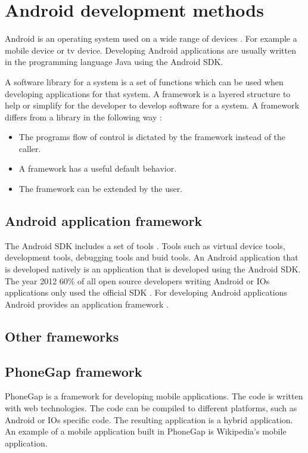 \section{Android development methods}\label{section-android-development-methods}
Android is an operating system used on a wide range of devices \cite{dell2011}. For example a mobile device or tv device. Developing Android applications are usually written in the 	programming language Java using the Android SDK.

A software library for a system is a set of functions which can be used when developing applications for that system. A framework is a layered structure to help or simplify for the developer to develop software for a system. A framework differs from a library in the following way \cite{riehle2000}:

\begin{itemize}
\item The programs flow of control is dictated by the framework instead of the caller.
\item A framework has a useful default behavior.
\item The framework can be extended by the user.
\end{itemize}

\subsection{Android application framework} 
The Android SDK includes a set of tools \cite{sdk2015}. Tools such as virtual device tools, development tools, debugging tools and buid tools. An Android application that is developed natively is an application that is developed using the Android SDK. The year 2012 60\% of all open source developers writing Android or IOs applications only used the official SDK \cite{eclipse2012}. For developing Android applications Android provides an application framework \cite{android-framework2015}.


\subsection{Other frameworks}

\subsection{PhoneGap framework}
PhoneGap is a framework for developing mobile applications. The code is written with web technologies. The code can be compiled to different platforms, such as Android or IOs specific code. The resulting application is a hybrid application. An example of a mobile application built in PhoneGap is Wikipedia's mobile application.

